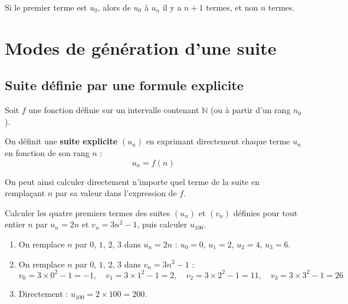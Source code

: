 \begin{attention}
	Si le premier terme est $u_0$, alors de $u_0$ à $u_n$ il y a $n + 1$ termes, et non $n$ termes.
\end{attention}

\section{Modes de génération d'une suite}

\subsection{Suite définie par une formule explicite}

\begin{defin}
	Soit $f$ une fonction définie sur un intervalle contenant $\mathbb{N}$ (ou à partir d'un rang $n_0$).

	On définit une \textbf{suite explicite} $(u_n)$ en exprimant directement chaque terme $u_n$ en fonction de son rang $n$ :
	\[
		u_n = f(n)
	\]

	On peut ainsi calculer directement n'importe quel terme de la suite en remplaçant $n$ par sa valeur dans l'expression de $f$.
\end{defin}

\newpage

\begin{methode}
	Calculer les quatre premiers termes des suites $(u_n)$ et $(v_n)$ définies pour tout entier $n$ par $u_n = 2n$ et $v_n = 3n^2 - 1$, puis calculer $u_{100}$.

	\begin{correction}
		\nline
		\begin{enumerate}
			\item On remplace $n$ par $0$, $1$, $2$, $3$ dans $u_n = 2n$ : $u_0 = 0$, $u_1 = 2$, $u_2 = 4$, $u_3 = 6$.
			\item On remplace $n$ par $0$, $1$, $2$, $3$ dans $v_n = 3n^2 - 1$ :
			      \[
				      v_0 = 3 \times 0^2 - 1 = -1, \quad v_1 = 3 \times 1^2 - 1 = 2, \quad v_2 = 3 \times 2^2 - 1 = 11, \quad v_3 = 3 \times 3^2 - 1 = 26
			      \]
			\item Directement : $u_{100} = 2 \times 100 = 200$.
		\end{enumerate}
	\end{correction}
\end{methode}


